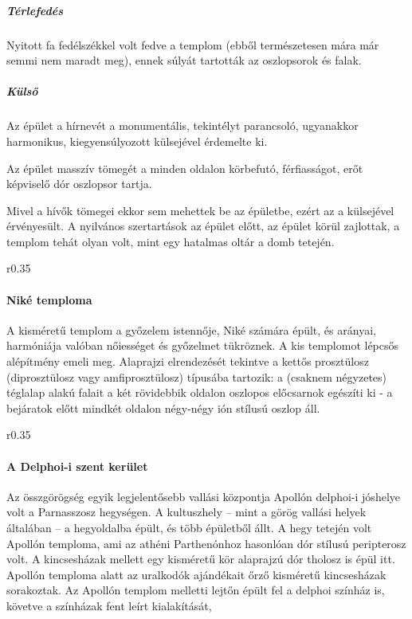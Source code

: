 \subparagraph{Térlefedés}
Nyitott fa fedélszékkel volt fedve a templom (ebből természetesen mára már semmi nem maradt meg), ennek súlyát tartották az oszlopsorok és falak.

\clearpage

\subparagraph{Külső}
Az épület a hírnevét a monumentális, tekintélyt parancsoló, ugyanakkor harmonikus, kiegyensúlyozott külsejével érdemelte ki.

Az épület masszív tömegét a minden oldalon körbefutó, férfiasságot, erőt képviselő dór oszlopsor tartja.

Mivel a hívők tömegei ekkor sem mehettek be az épületbe, ezért az a külsejével érvényesült. A nyilvános szertartások az épület előtt, az épület körül zajlottak, a templom tehát olyan volt, mint egy hatalmas oltár a domb tetején.

\begin{wrapfigure}{r}{0.35\textwidth}
\end{wrapfigure}

\paragraph{Niké temploma}
A kisméretű templom a győzelem istennője, Niké számára épült, és arányai, harmóniája valóban nőiességet és győzelmet tükröznek. A kis templomot lépcsős alépítmény emeli meg. Alaprajzi elrendezését tekintve a kettős prosztülosz (diprosztülosz vagy amfiprosztülosz) típusába tartozik: a (csaknem négyzetes) téglalap alakú falait a két rövidebbik oldalon oszlopos előcsarnok egészíti ki - a bejáratok előtt mindkét oldalon négy-négy ión stílusú oszlop áll.

\begin{wrapfigure}{r}{0.35\textwidth}
\end{wrapfigure}


\paragraph{A Delphoi-i szent kerület}

Az összgörögség egyik legjelentősebb vallási központja Apollón delphoi-i jóshelye volt a Parnasszosz hegységen. A kultuszhely – mint a görög vallási helyek általában – a hegyoldalba épült, és több épületből állt. A hegy tetején volt Apollón temploma, ami az athéni Parthenónhoz hasonlóan dór stílusú peripterosz volt. A kincsesházak mellett egy kisméretű kör alaprajzú dór tholosz is épül itt. Apollón temploma alatt az uralkodók ajándékait őrző kisméretű
kincsesházak sorakoztak. Az Apollón templom melletti lejtőn épült fel a delphoi színház is, követve a színházak fent leírt kialakítását,

